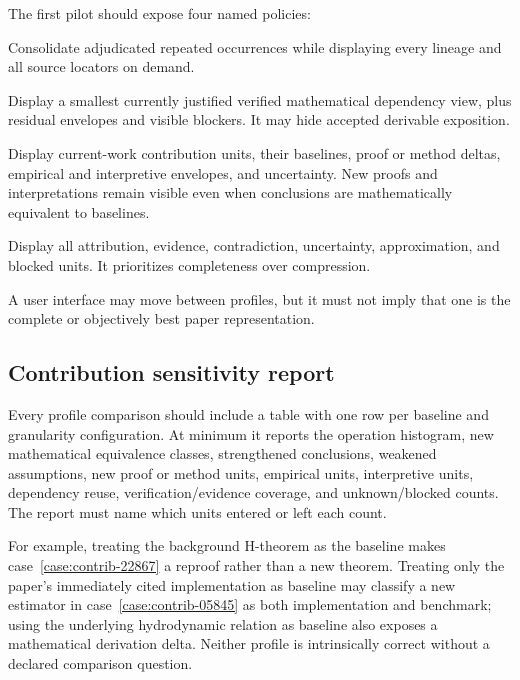 The first pilot should expose four named policies:
\begin{description}[style=nextline]
  \item[\status{occurrence\_overview}.] Consolidate adjudicated repeated occurrences while displaying every lineage and all source locators on demand.
  \item[\status{mathematical\_skeleton}.] Display a smallest currently justified verified mathematical dependency view, plus residual envelopes and visible blockers. It may hide accepted derivable exposition.
  \item[\status{paper\_contribution}.] Display current-work contribution units, their baselines, proof or method deltas, empirical and interpretive envelopes, and uncertainty. New proofs and interpretations remain visible even when conclusions are mathematically equivalent to baselines.
  \item[\status{evidence\_audit}.] Display all attribution, evidence, contradiction, uncertainty, approximation, and blocked units. It prioritizes completeness over compression.
\end{description}
A user interface may move between profiles, but it must not imply that one is the complete or objectively best paper representation.

\subsection{Contribution sensitivity report}

Every profile comparison should include a table with one row per baseline and granularity configuration. At minimum it reports the operation histogram, new mathematical equivalence classes, strengthened conclusions, weakened assumptions, new proof or method units, empirical units, interpretive units, dependency reuse, verification/evidence coverage, and unknown/blocked counts. The report must name which units entered or left each count.

For example, treating the background H-theorem as the baseline makes case~\ref{case:contrib-22867} a reproof rather than a new theorem. Treating only the paper's immediately cited implementation as baseline may classify a new estimator in case~\ref{case:contrib-05845} as both implementation and benchmark; using the underlying hydrodynamic relation as baseline also exposes a mathematical derivation delta. Neither profile is intrinsically correct without a declared comparison question.

